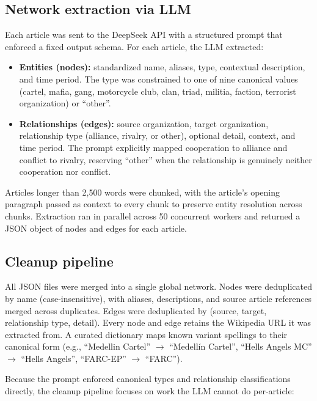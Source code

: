 \documentclass[11pt,a4paper]{article}
\begin{document}
\subsection{Network extraction via LLM}
Each article was sent to the DeepSeek API with a structured prompt that enforced a fixed output schema. For each article, the LLM extracted:
\begin{itemize}[leftmargin=2em]
  \item \textbf{Entities (nodes):} standardized name, aliases, type, contextual description, and time period. The type was constrained to one of nine canonical values (cartel, mafia, gang, motorcycle club, clan, triad, militia, faction, terrorist organization) or ``other''.
  \item \textbf{Relationships (edges):} source organization, target organization, relationship type (alliance, rivalry, or other), optional detail, context, and time period. The prompt explicitly mapped cooperation to alliance and conflict to rivalry, reserving ``other'' when the relationship is genuinely neither cooperation nor conflict.
  
\end{itemize}
Articles longer than 2{,}500 words were chunked, with the article's opening paragraph passed as context to every chunk to preserve entity resolution across chunks. Extraction ran in parallel across 50 concurrent workers and returned a JSON object of nodes and edges for each article.

\subsection{Cleanup pipeline}

All JSON files were merged into a single global network. Nodes were deduplicated by name (case-insensitive), with aliases, descriptions, and source article references merged across duplicates. Edges were deduplicated by (source, target, relationship type, detail). Every node and edge retains the Wikipedia URL it was extracted from. A curated dictionary maps known variant spellings to their canonical form (e.g., ``Medellin Cartel'' $\rightarrow$ ``Medell\'in Cartel'', ``Hells Angels MC'' $\rightarrow$ ``Hells Angels'', ``FARC-EP'' $\rightarrow$ ``FARC'').

Because the prompt enforced canonical types and relationship classifications directly, the cleanup pipeline focuses on work the LLM cannot do per-article:
\end{document}
